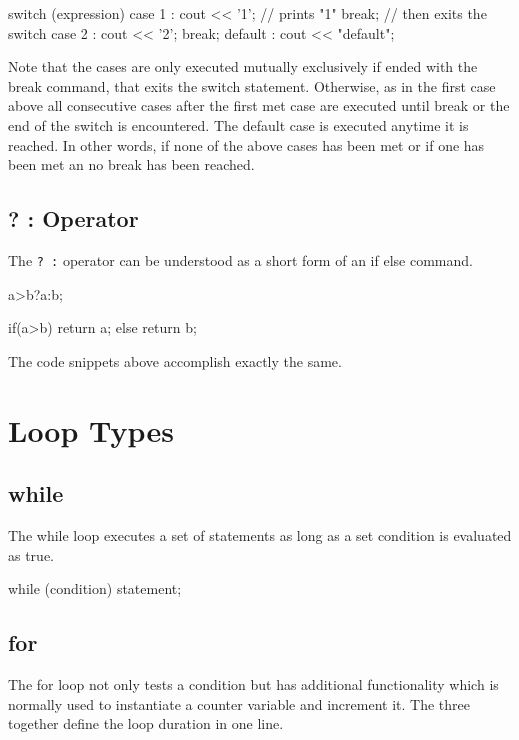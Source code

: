 \documentclass[10pt,a4paper]{scrartcl}
\begin{document}
\begin{multicols*}{2}
\begin{TPCpp}
switch (expression) {
	case 1 : cout << '1'; // prints "1"
		break;	// then exits the switch
	case 2 : cout << '2';
		break;
	default : cout << "default";
}
\end{TPCpp}

Note that the cases are only executed mutually exclusively if ended with the break command, that exits the switch statement. Otherwise, as in the first case above all consecutive cases after the first met case are executed until break or the end of the switch is encountered. The default case is executed anytime it is reached. In other words, if none of the above cases has been met or if one has been met an no break has been reached. 

\subsection{? : Operator}

The \verb+? :+ operator can be understood as a short form of an if else command.

\begin{TPCpp}
a>b?a:b;

if(a>b) {
	return a;
}
else {
	return b;
}
\end{TPCpp}

The code snippets above accomplish exactly the same.

\section{Loop Types}

\subsection{while}

The while loop executes a set of statements as long as a set condition is evaluated as true.

\begin{TPCpp}
while (condition) {
	statement;
}
\end{TPCpp}

\subsection{for}

The for loop not only tests a condition but has additional functionality which is normally used to instantiate a counter variable and increment it. The three together define the loop duration in one line.


\end{multicols*}
\end{document}
